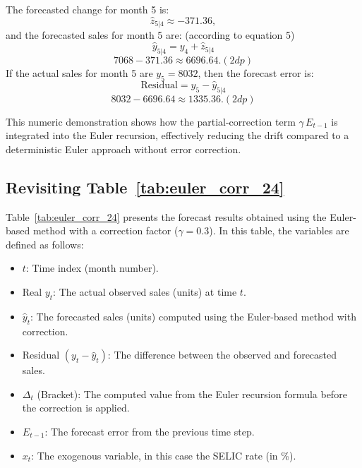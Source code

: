 \documentclass[10pt]{article}
\begin{document}
The forecasted change for month 5 is:
\[
\hat{z}_{5|4} \approx -371.36,
\]
and the forecasted sales for month 5 are: (according to equation 5)
\[
\hat{y}_{5|4} = y_4 + \hat{z}_{5|4} \] \[7068 - 371.36 \approx 6696.64. (2dp)
\]
If the actual sales for month 5 are \(y_5 = 8032\), then the forecast error is:
\[
\text{Residual} = y_5 - \hat{y}_{5|4}\]  \[8032 - 6696.64 \approx 1335.36. (2dp)
\]

This numeric demonstration shows how the partial-correction term \(\gamma\,E_{t-1}\) is integrated into the Euler recursion, effectively reducing the drift compared to a deterministic Euler approach without error correction.


\subsection{Revisiting Table~\ref{tab:euler_corr_24}}

Table~\ref{tab:euler_corr_24} presents the forecast results obtained using the Euler-based method with a correction factor (\(\gamma=0.3\)). In this table, the variables are defined as follows:
\begin{itemize}
    \item \(t\): Time index (month number).
    \item Real \(y_t\): The actual observed sales (units) at time \(t\).
    \item \(\hat{y}_t\): The forecasted sales (units) computed using the Euler-based method with correction.
    \item Residual \((y_t-\hat{y}_t)\): The difference between the observed and forecasted sales.
    \item \(\Delta_t\) (Bracket): The computed value from the Euler recursion formula before the correction is applied.
    \item \(E_{t-1}\): The forecast error from the previous time step.
    \item \(x_t\): The exogenous variable, in this case the SELIC rate (in \%).
\end{itemize}
\end{document}
